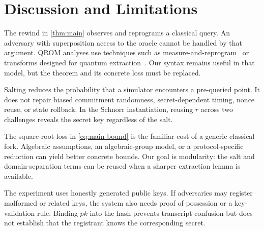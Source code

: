 \section{Discussion and Limitations}
\label{sec:limitations}

 The rewind in \cref{thm:main} observes
and reprograms a classical query.  An adversary with superposition access to
the oracle cannot be handled by that argument.  QROM analyses use techniques
such as measure-and-reprogram~\cite{DonEtAl2019} or transforms designed for
quantum extraction~\cite{Unruh2015}.  Our syntax remains useful in that model,
but the theorem and its concrete loss must be replaced.

 Salting reduces the probability that a simulator
encounters a pre-queried point.  It does not repair biased commitment
randomness, secret-dependent timing, nonce reuse, or state rollback.  In the
Schnorr instantiation, reusing $r$ across two challenges reveals the secret key
regardless of the salt.

 The square-root loss in \cref{eq:main-bound} is the
familiar cost of a generic classical fork.  Algebraic assumptions, an
algebraic-group model, or a protocol-specific reduction can yield better
concrete bounds.  Our goal is modularity: the salt and domain-separation terms
can be reused when a sharper extraction lemma is available.

 The experiment uses honestly generated public
keys.  If adversaries may register malformed or related keys, the system also
needs proof of possession or a key-validation rule.  Binding $pk$ into the
hash prevents transcript confusion but does not establish that the registrant
knows the corresponding secret.
